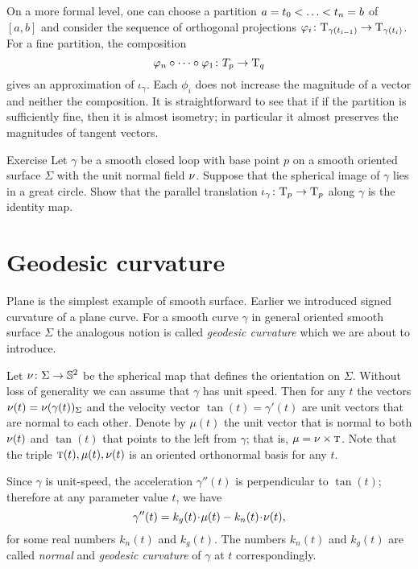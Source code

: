 On a more formal level, one can choose a partition $a=t_0<\dots\z<t_n=b$ of $[a,b]$
and consider the sequence of orthogonal projections $\varphi_i\colon\mathrm{T}_{\gamma(t_{i-1})}\to\mathrm{T}_{\gamma(t_i)}$.
For a fine partition, the composition 
\[\phi_n\circ\dots\circ\phi_1\:T_p\z\to\T_q\]
gives an approximation of $\iota_\gamma$.
Each $\phi_i$ does not increase the magnitude of a vector and neither the composition.
It is straightforward to see that if if the partition is sufficiently fine, then it is almost isometry; in particular it almost preserves the magnitudes of tangent vectors.

\begin{thm}{Exercise}\label{ex:parallel-transport-equator}
Let $\gamma$ be a smooth closed loop with base point $p$ on a smooth oriented surface $\Sigma$ with the unit normal field $\nu$.
Suppose that the spherical image of $\gamma$ lies in a great circle.
Show that the parallel translation $\iota_\gamma\colon\mathrm{T}_p\to \mathrm{T}_p$ along $\gamma$ is the identity map.
\end{thm}


\section*{Geodesic curvature}

Plane is the simplest example of smooth surface.
Earlier we introduced signed curvature of a plane curve.
For a smooth curve $\gamma$ in general oriented smooth surface $\Sigma$ the analogous notion is called \emph{geodesic curvature} which we are about to introduce.

Let $\nu\colon\Sigma\to \mathbb{S}^2$ be the spherical map that defines the orientation on $\Sigma$.
Without loss of generality we can assume that $\gamma$ has unit speed.
Then for any $t$ the vectors $\nu(t)=\nu(\gamma(t))_\Sigma$ and the velocity vector $\tan(t)=\gamma'(t)$ are unit vectors that are normal to each other.
Denote by $\mu(t)$ the unit vector that is normal to both $\nu(t)$ and $\tan(t)$ that points to the left from $\gamma$; that is, $\mu=\nu\times \textsc{t}$.
Note that the triple $\textsc{t}(t),\mu(t),\nu(t)$ is an oriented orthonormal basis for any $t$.

Since $\gamma$ is unit-speed, the acceleration $\gamma''(t)$ is perpendicular to $\tan(t)$;
therefore at any parameter value $t$, we have
\[\gamma''(t)=k_g(t)\cdot \mu(t)-k_n(t)\cdot \Norm(t),\]
for some real numbers $k_n(t)$ and $k_g(t)$.
The numbers $k_n(t)$ and $k_g(t)$ are called \emph{normal} and \emph{geodesic curvature} of $\gamma$ at $t$ correspondingly.

